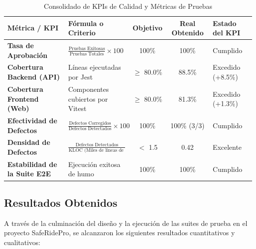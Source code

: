 \documentclass{article}
\begin{document}
\begin{table}[H]
\centering
\small
\caption{Consolidado de KPIs de Calidad y Métricas de Pruebas} \label{tab:kpis}
\begin{tabularx}{\linewidth}{|P{4.2cm}|P{3.8cm}|c|c|Y|}
\hline
{}
\textbf{Métrica / KPI} & \textbf{Fórmula o Criterio} & \textbf{Objetivo} & \textbf{Real Obtenido} & \textbf{Estado del KPI} \\
\hline
\textbf{Tasa de Aprobación} & $\frac{\text{Pruebas Exitosas}}{\text{Pruebas Totales}} \times 100$ & 100\% & 100\% & Cumplido \\
\hline
\textbf{Cobertura Backend (API)} & Líneas ejecutadas por Jest & $\ge$ 80.0\% & 88.5\% & Excedido (+8.5\%) \\
\hline
\textbf{Cobertura Frontend (Web)} & Componentes cubiertos por Vitest & $\ge$ 80.0\% & 81.3\% & Excedido (+1.3\%) \\
\hline
\textbf{Efectividad de Defectos} & $\frac{\text{Defectos Corregidos}}{\text{Defectos Detectados}} \times 100$ & 100\% & 100\% (3/3) & Cumplido \\
\hline
\textbf{Densidad de Defectos} & $\frac{\text{Defectos Detectados}}{\text{KLOC (Miles de líneas de cód.)}}$ & $<$ 1.5 & 0.42 & Excelente \\
\hline
\textbf{Estabilidad de la Suite E2E} & Ejecución exitosa de humo & 100\% & 100\% & Cumplido \\
\hline
\end{tabularx}
\end{table}


\subsection{Resultados Obtenidos}

A través de la culminación del diseño y la ejecución de las suites de prueba en el proyecto SafeRidePro, se alcanzaron los siguientes resultados cuantitativos y cualitativos:
\end{document}
